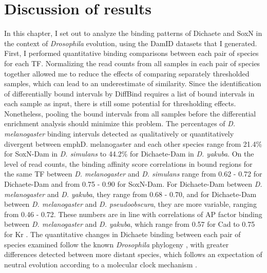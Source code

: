 \section{Discussion of results}
In this chapter, I set out to analyze the binding patterns of Dichaete and SoxN in the context of \emph{Drosophila} evolution, using the DamID datasets that I generated. First, I performed quantitative binding comparisons between each pair of species for each TF. Normalizing the read counts from all samples in each pair of species together allowed me to reduce the effects of comparing separately thresholded samples, which can lead to an underestimate of similarity. Since the identification of differentially bound intervals by DiffBind requires a list of bound intervals in each sample as input, there is still some potential for thresholding effects. Nonetheless, pooling the bound intervals from all samples before the differential enrichment analysis should minimize this problem. The percentages of \emph{D. melanogaster} binding intervals detected as qualitatively or quantitatively divergent between emph{D. melanogaster} and each other species range from 21.4\% for SoxN-Dam in \emph{D. simulans} to 44.2\% for Dichaete-Dam in \emph{D. yakuba}. On the level of read counts, the binding affinity score correlations in bound regions for the same TF between \emph{D. melanogaster} and \emph{D. simulans} range from 0.62 - 0.72 for Dichaete-Dam and from 0.75 - 0.90 for SoxN-Dam. For Dichaete-Dam between \emph{D. melanogaster} and \emph{D. yakuba}, they range from 0.68 - 0.70, and for Dichaete-Dam between \emph{D. melanogaster} and \emph{D. pseudoobscura}, they are more variable, ranging from 0.46 - 0.72. These numbers are in line with correlations of AP factor binding between \emph{D. melanogaster} and \emph{D. yakuba}, which range from 0.57 for Cad to 0.75 for Kr \citep{radley_binding_2010}. The quantitative changes in Dichaete binding between each pair of species examined follow the known \emph{Drosophila} phylogeny \citep{russo_molecular_1995}, with greater differences detected between more distant species, which follows an expectation of neutral evolution according to a molecular clock mechanism \citep{he_high_2011}.\\

